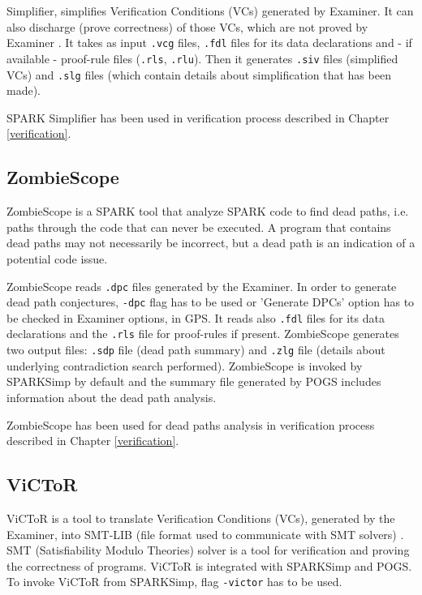Simplifier, simplifies Verification Conditions (VCs) generated by Examiner. It can also discharge (prove correctness) of those VCs, which are not proved by Examiner \cite{Simplifier:Online}. It takes as input \lstinline{.vcg} files, \lstinline{.fdl} files for its data declarations and - if available - proof-rule files (\lstinline{.rls}, \lstinline{.rlu}). Then it generates \lstinline{.siv} files (simplified VCs) and \lstinline{.slg} files (which contain details about simplification that has been made).

SPARK Simplifier has been used in verification process described in Chapter \ref{verification}.



\subsection{ZombieScope}
\label{background:sparkverification:zombiescope}

ZombieScope is a SPARK tool that analyze SPARK code to find dead paths, i.e. paths through the code that can never be executed. A program that contains dead paths may not necessarily be incorrect, but a dead path is an indication of a potential code issue.

ZombieScope reads \lstinline{.dpc} files generated by the Examiner. In order to generate dead path conjectures, \lstinline{-dpc} flag has to be used or 'Generate DPCs' option has to be checked in Examiner options, in GPS. It reads also \lstinline{.fdl} files for its data declarations and the \lstinline{.rls} file for proof-rules if present. ZombieScope generates two output files: \lstinline{.sdp} file (dead path summary) and \lstinline{.zlg} file (details about underlying contradiction search performed). ZombieScope is invoked by SPARKSimp by default and the summary file generated by POGS includes information about the dead path analysis.

ZombieScope has been used for dead paths analysis in verification process described in Chapter \ref{verification}.



\subsection{ViCToR}
\label{background:sparkverification:victor}

ViCToR is a tool to translate Verification Conditions (VCs), generated by the Examiner, into SMT-LIB (file format used to communicate with SMT solvers) \cite{Victor:Online}. SMT (Satisfiability Modulo Theories) solver is a tool for verification and proving the correctness of programs. ViCToR is integrated with SPARKSimp and POGS. To invoke ViCToR from SPARKSimp, flag \lstinline{-victor} has to be used.

